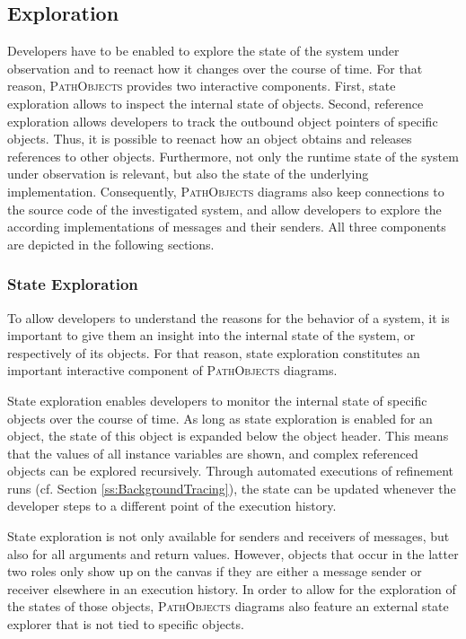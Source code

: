 \subsection{Exploration}
\label{ss:ApproachInteractiveExploration}
Developers have to be enabled to explore the state of the system under observation and to reenact how it changes over the course of time.
For that reason, \textsc{PathObjects} provides two interactive components.
First, state exploration allows to inspect the internal state of objects.
Second, reference exploration allows developers to track the outbound object pointers of specific objects.
Thus, it is possible to reenact how an object obtains and releases references to other objects.
Furthermore, not only the runtime state of the system under observation is relevant, but also the state of the underlying implementation.
Consequently, \textsc{PathObjects} diagrams also keep connections to the source code of the investigated system, and allow developers to explore the according implementations of messages and their senders.
All three components are depicted in the following sections.

\subsubsection{State Exploration}
To allow developers to understand the reasons for the behavior of a system, it is important to give them an insight into the internal state of the system, or respectively of its objects.
For that reason, state exploration constitutes an important interactive component of \textsc{PathObjects} diagrams.

State exploration enables developers to monitor the internal state of specific objects over the course of time.
As long as state exploration is enabled for an object, the state of this object is expanded below the object header.
This means that the values of all instance variables are shown, and complex referenced objects can be explored recursively.
Through automated executions of refinement runs (cf. Section \ref{ss:BackgroundTracing}), the state can be updated whenever the developer steps to a different point of the execution history.

State exploration is not only available for senders and receivers of messages, but also for all arguments and return values.
However, objects that occur in the latter two roles only show up on the canvas if they are either a message sender or receiver elsewhere in an execution history. 
In order to allow for the exploration of the states of those objects, \textsc{PathObjects} diagrams also feature an external state explorer that is not tied to specific objects.

